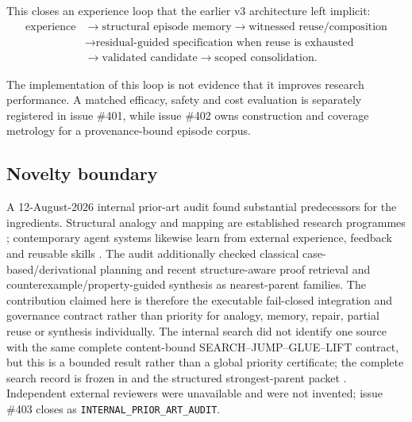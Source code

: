 This closes an experience loop that the earlier v3 architecture left implicit:
\begin{equation}
\begin{aligned}
\text{experience}
&\rightarrow \text{structural episode memory}
\rightarrow \text{witnessed reuse/composition}\\
&\rightarrow \text{residual-guided specification when reuse is exhausted}\\
&\rightarrow \text{validated candidate}
\rightarrow \text{scoped consolidation}.
\end{aligned}
\end{equation}

The implementation of this loop is not evidence that it improves research performance. A matched efficacy, safety and cost evaluation is separately registered in issue \#401, while issue \#402 owns construction and coverage metrology for a provenance-bound episode corpus.

\subsection{Novelty boundary}

A 12-August-2026 internal prior-art audit found substantial predecessors for the ingredients. Structural analogy and mapping are established research programmes \cite{gentner1983,holyoak1989}; contemporary agent systems likewise learn from external experience, feedback and reusable skills \cite{shinn2023,madaan2023,shen2026}. The audit additionally checked classical case-based/derivational planning and recent structure-aware proof retrieval and counterexample/property-guided synthesis as nearest-parent families. The contribution claimed here is therefore the executable fail-closed integration and governance contract rather than priority for analogy, memory, repair, partial reuse or synthesis individually. The internal search did not identify one source with the same complete content-bound SEARCH--JUMP--GLUE--LIFT contract, but this is a bounded result rather than a global priority certificate; the complete search record is frozen in  and the structured strongest-parent packet . Independent external reviewers were unavailable and were not invented; issue \#403 closes as \texttt{INTERNAL\_PRIOR\_ART\_AUDIT}.
